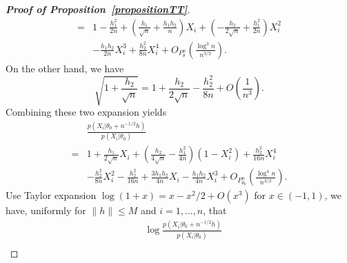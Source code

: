\documentclass[11pt]{article}
\theoremstyle{plain}
\theoremstyle{definition}
\theoremstyle{remark}
\begin{document}
\begin{appendices}
\begin{proof}[\textbf{Proof of Proposition~\ref{propositionTT}}]
\begin{align*}
    =&
1
-\frac{h_1^2}{2n}
+\left(\frac{h_1}{\sqrt{n}}+\frac{h_1 h_2}{n}\right)  X_i
+
    \left(
        -\frac{h_2}{2\sqrt{n}}
    +
     \frac{h_1^2}{2n}
\right)
    X_i^2
    \\
     &-\frac{h_1 h_2}{2n}X_i^3
    +\frac{h_2^2}{8n}X_i^4 
    +O_{P^n_{\theta}}\left(\frac{\log^3 n}{n^{3/2}}\right).
\end{align*}
On the other hand, we have
\begin{equation*}
    \sqrt{1+\frac{h_2}{\sqrt{n}}}=1+\frac{h_2}{2\sqrt{n}}-\frac{h_2^2}{8n} +O\left(\frac{1}{n^3}\right).
\end{equation*}
Combining these two expansion yields
\begin{equation*}
    \begin{split}
    &\frac{p(X_i|\theta_0+n^{-1/2}h)}{p(X_i|\theta_0)}
    \\
    =&
1
+\frac{h_1}{2\sqrt{n}} X_i
+\left(\frac{h_2}{4\sqrt{n}}-\frac{h_1^2}{4n}\right)
        (1-X_i^2)
    +\frac{h_2^2}{16n}X_i^4 
    \\
    &-\frac{h_2^2}{8n}X_i^2
-\frac{h_2^2}{16n}
+\frac{3 h_1 h_2}{4 n}  X_i
     -\frac{h_1 h_2}{4 n}X_i^3
     +O_{P^n_{\theta_0}}\left(\frac{\log^4 n}{n^{3/2}}\right).
    \end{split}
\end{equation*}
Use Taylor expansion $\log(1+x)=x-x^2/2+O(x^3)$ for $x\in(-1,1)$, we have, uniformly for $\|h\|\leq M$ and $i=1,\ldots,n$, that
\begin{equation*}
    \begin{split}
    &\log \frac{p(X_i|\theta_0+n^{-1/2}h)}{p(X_i|\theta_0)}
    \\

\end{split}
\end{equation*}
\end{proof}
\end{appendices}
\end{document}
